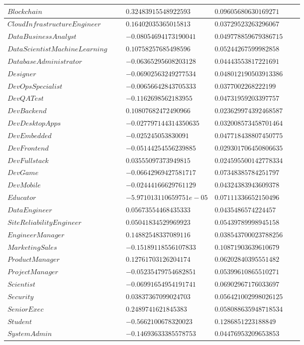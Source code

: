 \documentclass{report}
\begin{document}
\begin{longtable}{|R{0.4\linewidth}|R{0.3\linewidth}|R{0.3\linewidth}|}
  \hline
  $Blockchain$ & $0.32483915548922593$ & $0.09605680630169271$\\
  \hline
  $CloudInfrastructureEngineer$ & $0.16402035365015813$ & $0.03729523263296067$\\
  \hline
  $DataBusinessAnalyst$ & $-0.08054694173190041$ & $0.049778859679386715$\\
  \hline
  $DataScientistMachineLearning$ & $0.10758257685498596$ & $0.05244267599982858$\\
  \hline
  $DatabaseAdministrator$ & $-0.06365295608203128$ & $0.04443553817221691$\\
  \hline
  $Designer$ & $-0.06902563249277534$ & $0.048012190503913386$\\
  \hline
  $DevOpsSpecialist$ & $-0.00656642843705333$ & $0.0377002268222199$\\
  \hline
  $DevQATest$ & $-0.1162698562183955$ & $0.04731959203397757$\\
  \hline
  $DevBackend$ & $0.10807682472490966$ & $0.023629974392468587$\\
  \hline
  $DevDesktopApps$ & $-0.027797144314350635$ & $0.032008573458701464$\\
  \hline
  $DevEmbedded$ & $-0.025245053830091$ & $0.047718438807450775$\\
  \hline
  $DevFrontend$ & $-0.05144254556239885$ & $0.029301706450806635$\\
  \hline
  $DevFullstack$ & $0.03555097373949815$ & $0.024595500142778334$\\
  \hline
  $DevGame$ & $-0.06642969427581717$ & $0.07348385784251797$\\
  \hline
  $DevMobile$ & $-0.02444166629761129$ & $0.04324383943609378$\\
  \hline
  $Educator$ & $-5.971013110659751e-05$ & $0.07111336652150496$\\
  \hline
  $DataEngineer$ & $0.05673554468435333$ & $0.0435486574224457$\\
  \hline
  $SiteReliabilityEngineer$ & $0.05041834529969923$ & $0.05439789998945158$\\
  \hline
  $EngineerManager$ & $0.14882548337089116$ & $0.038543700023788256$\\
  \hline
  $MarketingSales$ & $-0.15189118556107833$ & $0.10871903639610679$\\
  \hline
  $ProductManager$ & $0.12761703126204174$ & $0.06202840395551482$\\
  \hline
  $ProjectManager$ & $-0.05235479754682851$ & $0.05399610865510271$\\
  \hline
  $Scientist$ & $-0.06991654954191741$ & $0.06902967176033697$\\
  \hline
  $Security$ & $0.03837367099024703$ & $0.056421002998026125$\\
  \hline
  $SeniorExec$ & $0.2489741621845383$ & $0.058088635948718534$\\
  \hline
  $Student$ & $-0.5662100678320023$ & $0.1286851223188849$\\
  \hline
  $SystemAdmin$ & $-0.14693633385578753$ & $0.04476953209653853$ \\
  \hline
\end{longtable}
\end{document}
